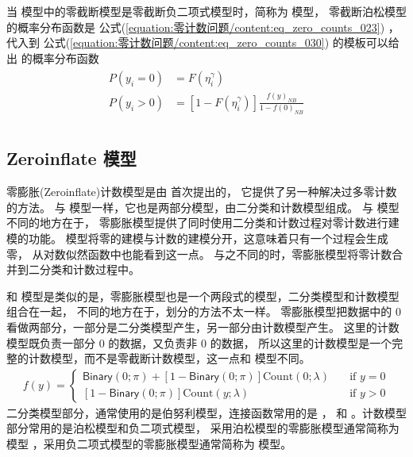 \documentclass[letterpaper,10pt,english]{sphinxmanual}
\begin{document}
当  模型中的零截断模型是零截断负二项式模型时，简称为  模型，
零截断泊松模型的概率分布函数是 公式(\ref{equation:零计数问题/content:eq_zero_counts_023})
，代入到 公式(\ref{equation:零计数问题/content:eq_zero_counts_030}) 的模板可以给出  的概率分布函数
\begin{align}\label{equation:零计数问题/content:eq_zero_counts_034}\!\begin{aligned}
P(y_i=0) &= F(\eta^{\gamma}_i)\\
P(y_i>0) &= \left [ 1-F(\eta^{\gamma}_i) \right ]
 \frac{f(y)_{NB}}{1-f(0)_{NB}}\\
\end{aligned}\end{align}

\subsection{Zero\sphinxhyphen{}inflate 模型}
\label{\detokenize{_u96f6_u8ba1_u6570_u95ee_u9898/content:zero-inflate}}
零膨胀(Zero\sphinxhyphen{}inflate)计数模型是由  首次提出的，
它提供了另一种解决过多零计数的方法。
与  模型一样，它也是两部分模型，由二分类和计数模型组成。
与  模型不同的地方在于，
零膨胀模型提供了同时使用二分类和计数过程对零计数进行建模的功能。
 模型将零的建模与计数的建模分开，这意味着只有一个过程会生成零，
从对数似然函数中也能看到这一点。
与之不同的时，零膨胀模型将零计数合并到二分类和计数过程中。

和  模型是类似的是，零膨胀模型也是一个两段式的模型，二分类模型和计数模型组合在一起，
不同的地方在于，划分的方法不太一样。
零膨胀模型把数据中的 \(0\)
看做两部分，一部分是二分类模型产生，另一部分由计数模型产生。
这里的计数模型既负责一部分 \(0\) 的数据，又负责非 \(0\) 的数据，
所以这里的计数模型是一个完整的计数模型，而不是零截断计数模型，这一点和 
模型不同。
\begin{equation}\label{equation:零计数问题/content:eq_zero_counts_050}
\begin{split}f(y)
=
\begin{cases}
\textsf{Binary}(0 ; \pi) + [1-\textsf{Binary}(0 ; \pi) ] \text{Count}(0;\lambda) &\quad \text{if } y = 0\\
[1-\textsf{Binary}(0 ; \pi)] \text{Count}(y;\lambda)
&\quad\text{if } y > 0
\end{cases}\end{split}
\end{equation}
二分类模型部分，通常使用的是伯努利模型，连接函数常用的是 
，   和 
。计数模型部分常用的是泊松模型和负二项式模型，
采用泊松模型的零膨胀模型通常简称为  模型
，采用负二项式模型的零膨胀模型通常简称为  模型。
\end{document}
